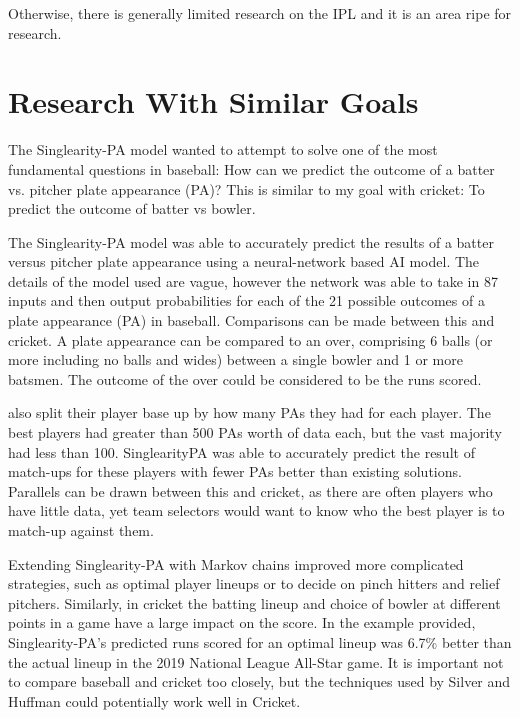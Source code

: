 \documentclass[12pt,a4paper]{report}
\theoremstyle{definition}
\begin{document}
Otherwise, there is generally limited research on the IPL and it is an area ripe for research.

\section{Research With Similar Goals}

The Singlearity-PA model \citep{silver2021baseball} wanted to attempt to solve one of the most fundamental questions in baseball:	 How can we	predict the outcome of a batter	vs. pitcher plate appearance (PA)? 
This is similar to my goal with cricket: To predict the outcome of batter vs bowler.

The Singlearity-PA model \citep{silver2021baseball} was able to accurately predict the results of a batter versus pitcher plate appearance using a neural-network based AI model. 
The details of the model used are vague, however the network was able to take in 87 inputs and then output probabilities for each of the 21 possible outcomes of a plate appearance (PA) in baseball. 
Comparisons can be made between this and cricket. 
A plate appearance can be compared to an over, comprising 6 balls (or more including no balls and wides) between a single bowler and 1 or more batsmen. 
The outcome of the over could be considered to be the runs scored. 

\citet{silver2021baseball} also split their player base up by how many PAs they had for each player. 
The best players had greater than 500 PAs worth of data each, but the vast majority had less than 100. 
SinglearityPA was able to accurately predict the result of match-ups for these players with fewer PAs better than existing solutions. 
Parallels can be drawn between this and cricket, as there are often players who have little data, yet team selectors would want to know who the best player is to match-up against them.

Extending Singlearity-PA with Markov chains improved more complicated strategies, such as optimal player lineups or to decide on pinch hitters and relief pitchers. 
Similarly, in cricket the batting lineup and choice of bowler at different points in a game have a large impact on the score. 
In the example provided, Singlearity-PA's predicted runs scored for an optimal lineup was 6.7\% better than the actual lineup in the 2019 National League All-Star game. 
It is important not to compare baseball and cricket too closely, but the techniques used by Silver and Huffman could potentially work well in Cricket.
\end{document}
